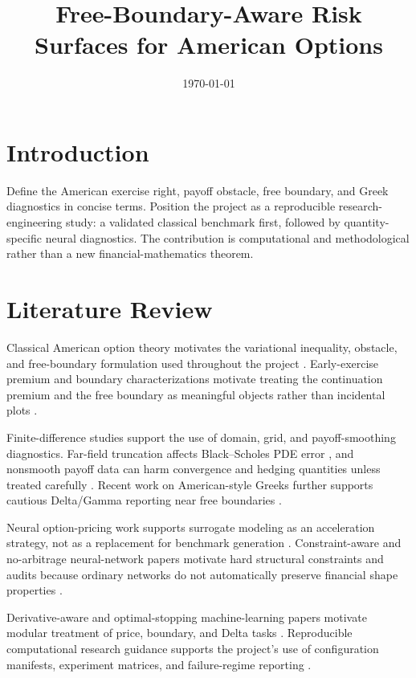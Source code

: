\documentclass[11pt]{article}
\title{Free-Boundary-Aware Risk Surfaces for American Options}
\date{\today}
\begin{document}
\maketitle

\section{Introduction}
Define the American exercise right, payoff obstacle, free boundary, and Greek
diagnostics in concise terms. Position the project as a reproducible
research-engineering study: a validated classical benchmark first, followed by
quantity-specific neural diagnostics. The contribution is computational and
methodological rather than a new financial-mathematics theorem.

\section{Literature Review}
Classical American option theory motivates the variational inequality, obstacle, and free-boundary formulation used throughout the project \cite{JailletLambertonLapeyre1990,HuangPang1998}. Early-exercise premium and boundary characterizations motivate treating the continuation premium and the free boundary as meaningful objects rather than incidental plots \cite{Kim1990,CarrJarrowMyneni1992,Peskir2005,ChenChadam2007,EvansKuskeKeller2002}.

Finite-difference studies support the use of domain, grid, and payoff-smoothing diagnostics. Far-field truncation affects Black--Scholes PDE error \cite{KangroNicolaides2000}, and nonsmooth payoff data can harm convergence and hedging quantities unless treated carefully \cite{PooleyVetzalForsyth2003,GilesCarter2006}. Recent work on American-style Greeks further supports cautious Delta/Gamma reporting near free boundaries \cite{InTHout2024}.

Neural option-pricing work supports surrogate modeling as an acceleration strategy, not as a replacement for benchmark generation \cite{HutchinsonLoPoggio1994,RufWang2020,LiuOosterleeBohte2019}. Constraint-aware and no-arbitrage neural-network papers motivate hard structural constraints and audits because ordinary networks do not automatically preserve financial shape properties \cite{DugasEtAl2009,YangZhengHospedales2017,CaoLiuZhai2021}.

Derivative-aware and optimal-stopping machine-learning papers motivate modular treatment of price, boundary, and Delta tasks \cite{BeckerCheriditoJentzen2019,HugeSavine2020,FrandsenPedersenPoulsen2022}. Reproducible computational research guidance supports the project's use of configuration manifests, experiment matrices, and failure-regime reporting \cite{SandveEtAl2013,WilsonEtAl2014}.
\end{document}
